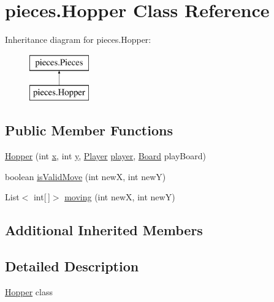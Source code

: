 \hypertarget{classpieces_1_1_hopper}{}\section{pieces.\+Hopper Class Reference}
\label{classpieces_1_1_hopper}
Inheritance diagram for pieces.\+Hopper\+:\begin{figure}[H]
\begin{center}
\leavevmode
\includegraphics[height=2.000000cm]{classpieces_1_1_hopper}
\end{center}
\end{figure}
\subsection*{Public Member Functions}
\begin{DoxyCompactItemize}
\item 
\mbox{\hyperlink{classpieces_1_1_hopper_a61251ca61d7a92fcfbaa12b6110e02e8}{Hopper}} (int \mbox{\hyperlink{classpieces_1_1_pieces_ac5178f9b8a6b0c4235851475081249f3}{x}}, int \mbox{\hyperlink{classpieces_1_1_pieces_a66d911734967a8ced1b9792fe900fadb}{y}}, \mbox{\hyperlink{classgame_1_1_player}{Player}} \mbox{\hyperlink{classpieces_1_1_pieces_a49f35044dd36e5c4b04261a8ea54ad0c}{player}}, \mbox{\hyperlink{classgame_1_1_board}{Board}} play\+Board)
\item 
boolean \mbox{\hyperlink{classpieces_1_1_hopper_a74ab407bf1ef68867f2f06f68ad73f06}{is\+Valid\+Move}} (int newX, int newY)
\item 
List$<$ int\mbox{[}$\,$\mbox{]}$>$ \mbox{\hyperlink{classpieces_1_1_hopper_a9cb2384553aded22be588ae1eff76d09}{moving}} (int newX, int newY)
\end{DoxyCompactItemize}
\subsection*{Additional Inherited Members}


\subsection{Detailed Description}
\mbox{\hyperlink{classpieces_1_1_hopper}{Hopper}} class 


